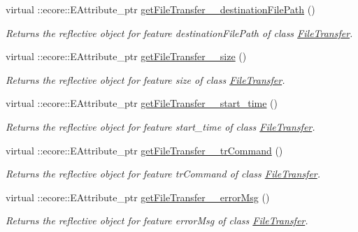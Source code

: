 \begin{DoxyCompactItemize}
virtual ::ecore::EAttribute\_\-ptr \hyperlink{classFMS__Data_1_1FMS__DataPackage_adbc15c51bc56a8d33cc6d0f99726cb89}{getFileTransfer\_\-\_\-destinationFilePath} ()
\begin{DoxyCompactList}\small\item\em Returns the reflective object for feature destinationFilePath of class \hyperlink{classFMS__Data_1_1FileTransfer}{FileTransfer}. \item\end{DoxyCompactList}\item 
virtual ::ecore::EAttribute\_\-ptr \hyperlink{classFMS__Data_1_1FMS__DataPackage_a66e48dbd6d198206d3c5672e603e962f}{getFileTransfer\_\-\_\-size} ()
\begin{DoxyCompactList}\small\item\em Returns the reflective object for feature size of class \hyperlink{classFMS__Data_1_1FileTransfer}{FileTransfer}. \item\end{DoxyCompactList}\item 
virtual ::ecore::EAttribute\_\-ptr \hyperlink{classFMS__Data_1_1FMS__DataPackage_ae4d38f101c55565a61e8fe0f3df28fe3}{getFileTransfer\_\-\_\-start\_\-time} ()
\begin{DoxyCompactList}\small\item\em Returns the reflective object for feature start\_\-time of class \hyperlink{classFMS__Data_1_1FileTransfer}{FileTransfer}. \item\end{DoxyCompactList}\item 
virtual ::ecore::EAttribute\_\-ptr \hyperlink{classFMS__Data_1_1FMS__DataPackage_a2c51426e4c01b958bee51d789c7e99fa}{getFileTransfer\_\-\_\-trCommand} ()
\begin{DoxyCompactList}\small\item\em Returns the reflective object for feature trCommand of class \hyperlink{classFMS__Data_1_1FileTransfer}{FileTransfer}. \item\end{DoxyCompactList}\item 
virtual ::ecore::EAttribute\_\-ptr \hyperlink{classFMS__Data_1_1FMS__DataPackage_a398719e27ca868d1247dda70cf0f6a0d}{getFileTransfer\_\-\_\-errorMsg} ()
\begin{DoxyCompactList}\small\item\em Returns the reflective object for feature errorMsg of class \hyperlink{classFMS__Data_1_1FileTransfer}{FileTransfer}. \item\end{DoxyCompactList}\item 

\end{DoxyCompactItemize}
